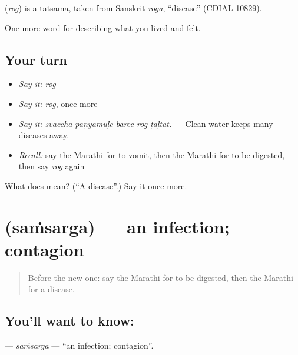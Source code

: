 \begin{cousinweb}
\textbf{} (\emph{rog}) is a tatsama, taken from Sanskrit \emph{roga}, \textquotedblleft{}disease\textquotedblright{} (CDIAL 10829).
\end{cousinweb}

\begin{grammarlens}[title={What you've built}]
One more word for describing what you lived and felt.
\end{grammarlens}

\subsection*{Your turn}
\begin{itemize}
\raggedright
  \item \emph{Say it:} \emph{rog}
  \item \emph{Say it:} \emph{rog}, once more
  \item \emph{Say it:} \emph{svaccha pāṇyāmuḷe barec rog ṭaḷtāt.} — Clean water keeps many diseases away.
  \item \emph{Recall:} say the Marathi for to vomit, then the Marathi for to be digested, then say \emph{rog} again
\end{itemize}

\begin{tcolorbox}[breakable,colback=teal!4,colframe=teal!35!black,title={Before you move on}]
What does  mean? (\textquotedblleft{}A disease\textquotedblright{}.) Say it once more.
\end{tcolorbox}
\section[\texorpdfstring{\mr{संसर्ग} (saṁsarga)}{संसर्ग (saṁsarga)}]{ (saṁsarga) — an infection; contagion}

\label{lesson:MR-C484-samsarga}



\begin{quote}
Before the new one: say the Marathi for to be digested, then the Marathi for a disease.
\end{quote}

\subsection*{You'll want to know: }
\textbf{} — \emph{saṁsarga} — \textquotedblleft{}an infection; contagion\textquotedblright{}.

